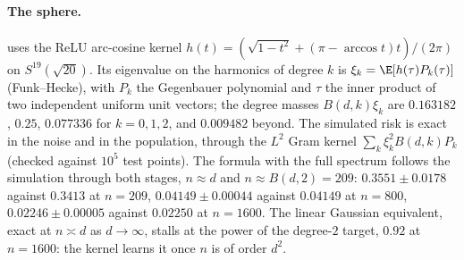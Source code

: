 \begin{refsection}
\paragraph{The sphere.}  uses the ReLU arc-cosine kernel $h(t)=(\sqrt{1-t^2}+(\pi-\arccos t)t)/(2\pi)$ on $S^{19}(\sqrt{20})$. Its eigenvalue on the harmonics of degree $k$ is $\xi_k=\E[h(\tau)P_k(\tau)]$ (Funk--Hecke), with $P_k$ the Gegenbauer polynomial and $\tau$ the inner product of two independent uniform unit vectors; the degree masses $B(d,k)\xi_k$ are $0.163182$, $0.25$, $0.077336$ for $k=0,1,2$, and $0.009482$ beyond. The simulated risk is exact in the noise and in the population, through the $L^2$ Gram kernel $\sum_k\xi_k^2B(d,k)P_k$ (checked against $10^5$ test points). The formula with the full spectrum follows the simulation through both stages, $n\approx d$ and $n\approx B(d,2)=209$: $0.3551\pm0.0178$ against $0.3413$ at $n=209$, $0.04149\pm0.00044$ against $0.04149$ at $n=800$, $0.02246\pm0.00005$ against $0.02250$ at $n=1600$. The linear Gaussian equivalent, exact at $n\asymp d$ as $d\to\infty$, stalls at the power of the degree-$2$ target, $0.92$ at $n=1600$: the kernel learns it once $n$ is of order $d^2$.


\end{refsection}
